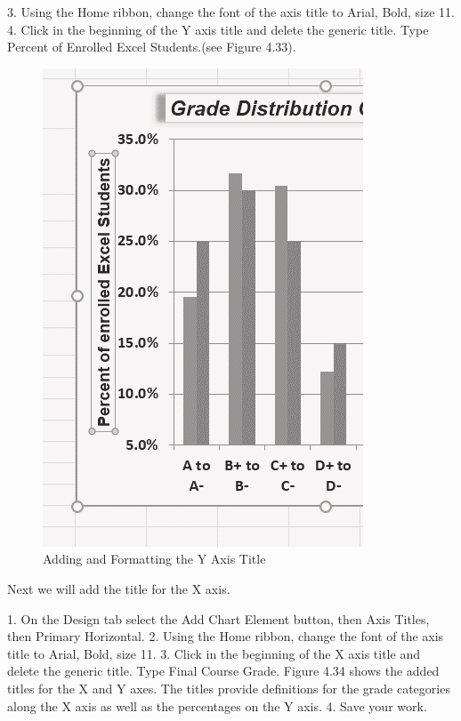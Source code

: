 3. Using the Home ribbon, change the font of the axis title to Arial, Bold, size 11.
4. Click in the beginning of the Y axis title and delete the generic title. Type Percent of Enrolled
Excel Students.(see Figure 4.33).


\begin{figure}[H]
	\centering
	\includegraphics[width=\maxwidth{.95\linewidth}]{gfx/ch04_fig36}
	\caption{Adding and Formatting the Y Axis Title}
	\label{04:fig36}
\end{figure}


Next we will add the title for the X axis.

1. On the Design tab select the Add Chart Element button, then Axis Titles, then Primary
Horizontal.
2. Using the Home ribbon, change the font of the axis title to Arial, Bold, size 11.
3. Click in the beginning of the X axis title and delete the generic title. Type Final Course Grade.
Figure 4.34 shows the added titles for the X and Y axes. The titles provide definitions for the
grade categories along the X axis as well as the percentages on the Y axis.
4. Save your work.

